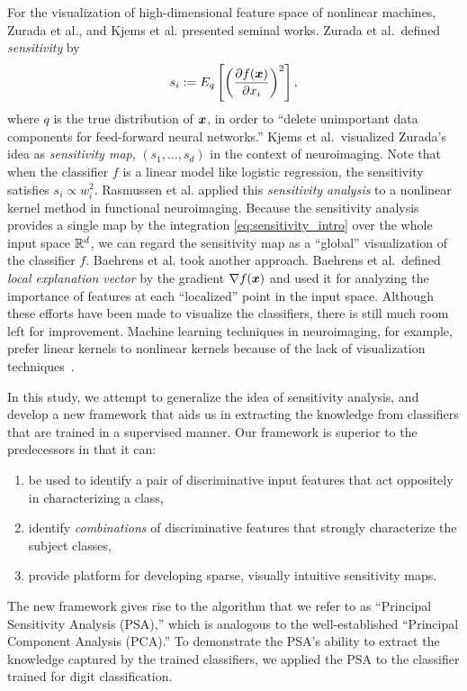 For the visualization of high-dimensional feature space of nonlinear machines,
Zurada et al.\~\cite{Zurada1994,Zurada1997},  and Kjems et al.\~\cite{Kjems2002}
presented seminal works.
%
Zurada et al.\ defined \textit{sensitivity} by
\begin{equation}
 \label{eq:sensitivity_intro}
 s_i := E_q \left[ \left(\frac{\partial f(\mbox{\boldmath $x$})}{\partial x_i} \right)^2 \right],
\end{equation}
where $q$ is the true distribution of $\mbox{\boldmath $x$}$,
in order to ``delete unimportant data components for feed-forward neural networks.''
Kjems et al.\ visualized Zurada's idea as \textit{sensitivity map}, $\left(s_1, \dots, s_d\right)$
in the context of neuroimaging.
%
Note that when the classifier $f$ is a linear model like logistic
regression, the sensitivity satisfies $s_i \propto w_i^2$.
%
Rasmussen et al.\~\cite{Rasmussen2011} applied this \textit{sensitivity analysis}
to a nonlinear kernel method in functional neuroimaging.
%
Because the sensitivity analysis provides a single map by the
integration \eqref{eq:sensitivity_intro} over the
whole input space $\mathbb{R}^{d}$, we can regard the sensitivity map as a
``global'' visualization of the classifier $f$.
%
Baehrens et al.\~\cite{Baehrens2010} took another approach.
%
Baehrens et al.\ defined \textit{local explanation vector} by the
gradient $\nabla f (\mbox{\boldmath $x$})$ and used it for
analyzing the importance of features at each ``localized'' point in the
input space.
%
Although these efforts have been made to visualize the
classifiers,
there is still much room left for improvement.
%
Machine learning techniques in neuroimaging, for example,
prefer linear kernels to nonlinear kernels because of the lack of
visualization techniques~\cite{LaConte2005}.

In this study, we attempt to  generalize the idea of sensitivity
analysis, and develop a new framework that aids us in extracting the
knowledge from classifiers that are trained in a supervised manner.
%
Our framework is superior to the predecessors in that it can:
\begin{enumerate}
 \item be used to identify a pair of discriminative input
       features that act oppositely in characterizing a class,
 \item identify \textit{combinations} of discriminative features that strongly
       characterize the subject classes,
 \item provide platform for developing sparse, visually intuitive
       sensitivity maps.
\end{enumerate}
%
The new framework gives rise to the algorithm that we refer
to as ``Principal Sensitivity Analysis (PSA),'' which is analogous to
the well-established ``Principal Component Analysis (PCA).''
%
To demonstrate the PSA's ability to extract the knowledge captured by
the trained classifiers, we applied the PSA to the classifier trained
for digit classification.

